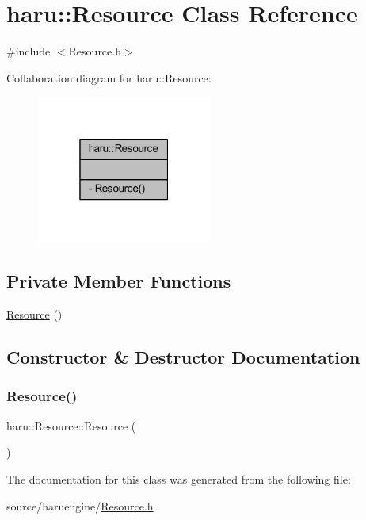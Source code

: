 \hypertarget{classharu_1_1_resource}{}\section{haru\+:\+:Resource Class Reference}
\label{classharu_1_1_resource}


{\ttfamily \#include $<$Resource.\+h$>$}



Collaboration diagram for haru\+:\+:Resource\+:\nopagebreak
\begin{figure}[H]
\begin{center}
\leavevmode
\includegraphics[width=163pt]{classharu_1_1_resource__coll__graph}
\end{center}
\end{figure}
\subsection*{Private Member Functions}
\begin{DoxyCompactItemize}
\item 
\mbox{\hyperlink{classharu_1_1_resource_a338ffdb66c7c406e5bc59870c4154550}{Resource}} ()
\end{DoxyCompactItemize}


\subsection{Constructor \& Destructor Documentation}
\mbox{\label{classharu_1_1_resource_a338ffdb66c7c406e5bc59870c4154550}} 
\subsubsection{\texorpdfstring{Resource()}{Resource()}}
{\footnotesize\ttfamily haru\+::\+Resource\+::\+Resource (\begin{DoxyParamCaption}{ }\end{DoxyParamCaption})\hspace{0.3cm}{\ttfamily [private]}}



The documentation for this class was generated from the following file\+:\begin{DoxyCompactItemize}
\item 
source/haruengine/\mbox{\hyperlink{_resource_8h}{Resource.\+h}}\end{DoxyCompactItemize}
